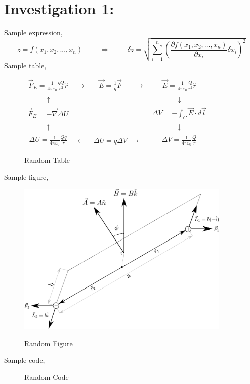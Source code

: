 \documentclass[12pt,a4paper]{article}
\begin{document}
	\section*{Investigation 1:}	
		Sample expression,
		\[ z = f(x_1,x_2,...,x_n) 
		\hspace{1cm} \Rightarrow \hspace{1cm}
		\delta z = \sqrt{\sum_{i=1}^n \left(
		\frac{\partial f(x_1,x_2,...,x_n)}{\partial x_i} \delta x_i \right)^2 }\]
		Sample table,
		\begin{figure}[H]
			\centering
			\begin{tabular}{ccccc}
				\(\displaystyle \vec{F}_E = \frac{1}{4 \pi \varepsilon_0} \frac{qQ}{r^2} \hat{r} \) &
				$\rightarrow$ & 
				$\displaystyle \vec{E} = \frac{1}{q} \vec{F}$ & 
				$\rightarrow$ &
				\(\displaystyle \vec{E} = \frac{1}{4 \pi \varepsilon_0} \frac{Q}{r^2} \hat{r} \)\\
				$\uparrow$ & & & & $\downarrow$\\
				\(\displaystyle \vec{F}_E = - \vec{\nabla} \Delta U\) & & & &
				\(\displaystyle \Delta V = - \int_C \vec{E} \cdot d\vec{l}\)\\
				$\uparrow$ & & & & $\downarrow$\\
				\(\displaystyle \Delta U = \frac{1}{4 \pi \varepsilon_0} \frac{Qq}{r} \) &
				$\leftarrow$ & 
				$\Delta U = q \Delta V$ & 
				$\leftarrow$ &
				\(\displaystyle \Delta V = \frac{1}{4 \pi \varepsilon_0} \frac{Q}{r} \)
			\end{tabular}
			\caption{Random Table}
		\end{figure} \noindent
		Sample figure,
		\begin{figure}[H]
			\centering
			\includegraphics[width=4in]{RandFigure}\\
			\caption{Random Figure}
		\end{figure} \noindent
		Sample code,
		\begin{figure}[H]
			
			\centering
			\caption{Random Code}
		\end{figure}
		
\end{document}
